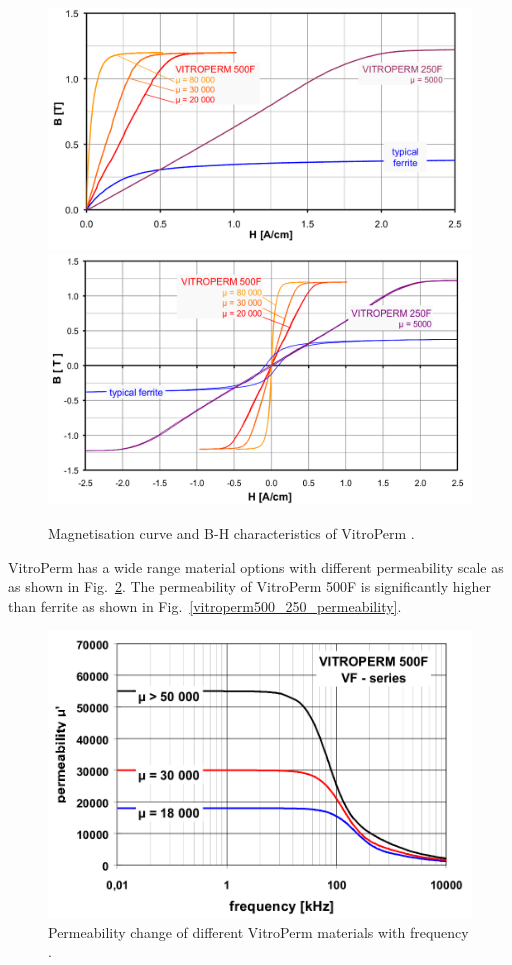 \documentclass[a4paper, 11pt]{article} %
\begin{document}
\begin{figure}[]
  \centering
    \includegraphics[scale=0.3]{vitroperm_magnetization}
    \includegraphics[scale=0.3]{vitroterm_hysteresis}
    \caption{Magnetisation curve and B-H characteristics of VitroPerm \cite{vitroterm_manual}.}
  \label{vitroterm_BH}
\end{figure}

VitroPerm has a wide range material options with different permeability scale as as shown in Fig.~\ref{vitroterm_permeability}. 
The permeability of VitroPerm 500F is significantly higher than ferrite as shown in Fig.~\ref{vitroperm500_250_permeability}.

\begin{figure}[]
  \centering
    \includegraphics[scale=0.3]{vitroterm_permeability}
  \caption{Permeability change of different VitroPerm materials with frequency \cite{vitroperm_toroidal}.}
  \label{vitroterm_permeability}
\end{figure}
\end{document}
